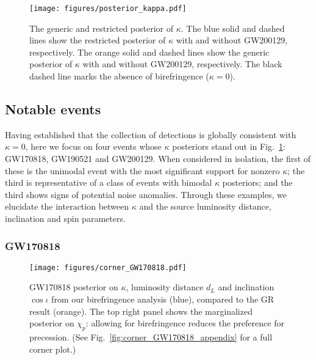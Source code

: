 \documentclass[aps,prd,twocolumn,superscriptaddress,preprintnumbers,floatfix,nofootinbib]{revtex4-2}
\begin{document}
\begin{figure}
    \texttt{[image: figures/posterior\_kappa.pdf]}
    \caption{
        The generic and restricted posterior of $\kappa$.
        The blue solid and dashed lines show the restricted posterior of $\kappa$ with and without GW200129, respectively.
        The orange solid and dashed lines show the generic posterior of $\kappa$ with and without GW200129, respectively.
        The black dashed line marks the absence of birefringence ($\kappa=0$).
    }
    \label{fig:posterior_kappa}
\end{figure}

\subsection{Notable events}
\label{sec:results:notable}

Having established that the collection of detections is globally consistent with $\kappa=0$, here we focus on four events whose $\kappa$ posteriors stand out in Fig.~\ref{fig:posterior_kappa}: GW170818, GW190521 and GW200129.
When considered in isolation, the first of these is the unimodal event with the most significant support for nonzero $\kappa$; the third is representative of a class of events with bimodal $\kappa$ posteriors; and the third shows signs of potential noise anomalies.
Through these examples, we elucidate the interaction between $\kappa$ and the source luminosity distance, inclination and spin parameters.

\subsubsection{GW170818}
\label{sec:GW170818}

\begin{figure}
    \texttt{[image: figures/corner\_GW170818.pdf]}
    \caption{
        GW170818 posterior on $\kappa$, luminosity distance $d_L$ and inclination $\cos\iota$ from our birefringence analysis (blue), compared to the GR result (orange).
        The top right panel shows the marginalized posterior on $\chi_p$: allowing for birefringence reduces the preference for precession.
        (See Fig.~\ref{fig:corner_GW170818_appendix} for a full corner plot.)
    }
    \label{fig:corner_GW170818}
\end{figure}
\end{document}
